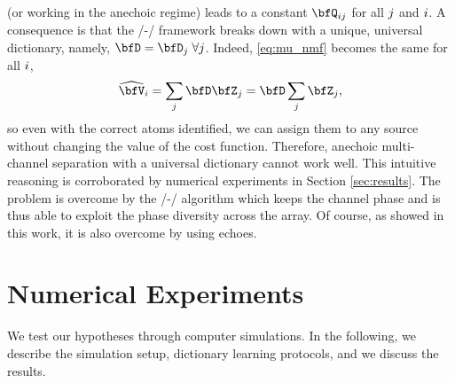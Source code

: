  (or working in the anechoic regime) leads to a constant $\vQ_{\idxMicSrc}$ for all $j$ and $i$.
A consequence is that the \MU/-\NMF/ framework breaks down with a unique, universal dictionary, namely, $\mD = \mD_j\;\forall j$.
Indeed, \eqref{eq:mu_nmf} becomes the same for all $i$,
\begin{equation*}
    \wh{\mV}_\idxMic = \sum_{\idxSrc} \mD \mZ_\idxSrc = \mD \sum_\idxSrc \mZ_\idxSrc,
\end{equation*}
so even with the correct atoms identified, we can assign them to any source without changing the value of the cost function.
Therefore, anechoic multi-channel separation with a universal dictionary cannot work well.
This intuitive reasoning is corroborated by numerical experiments in Section \ref{sec:results}.
The problem is overcome by the \EM/-\NMF/ algorithm which keeps the channel phase and is thus able to exploit the phase diversity across the array.
Of course, as showed in this work, it is also overcome by using echoes.

\section{Numerical Experiments}

We test our hypotheses through computer simulations.
In the following, we describe the simulation setup, dictionary learning protocols, and we discuss the results.

